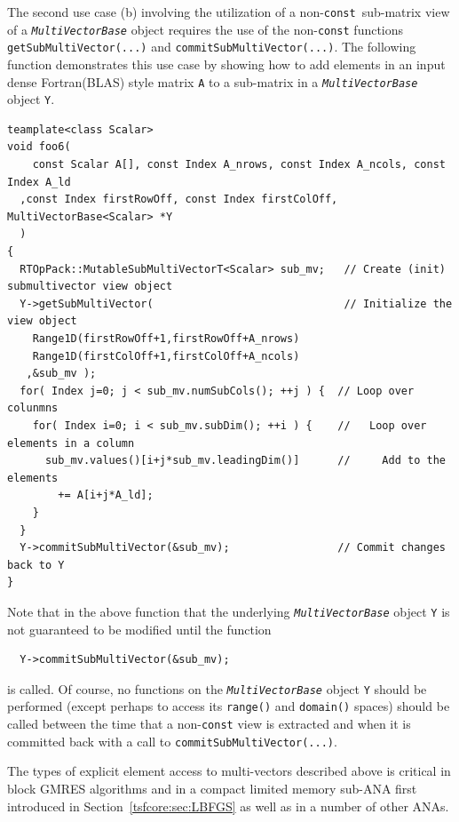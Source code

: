 \documentclass[pdf,ps2pdf,11pt]{SANDreport}
\begin{document}
The second use case (b) involving the utilization of a
non-{}\texttt{const}\ sub-matrix view of a
{}\texttt{\textit{Multi\-Vector\-Base}} object requires the use of the
non-{}\texttt{const} functions {}\texttt{get\-Sub\-Multi\-Vector(...)}
and {}\texttt{commit\-Sub\-Multi\-Vector(...)}.  The following
function demonstrates this use case by showing how to add elements in
an input dense Fortran(BLAS) style matrix {}\texttt{A} to a sub-matrix
in a {}\texttt{\textit{Multi\-Vector\-Base}} object {}\texttt{Y}.

{\scriptsize\begin{verbatim}
teamplate<class Scalar>
void foo6(
	const Scalar A[], const Index A_nrows, const Index A_ncols, const Index A_ld
  ,const Index firstRowOff, const Index firstColOff, MultiVectorBase<Scalar> *Y
  )
{
  RTOpPack::MutableSubMultiVectorT<Scalar> sub_mv;   // Create (init) submultivector view object
  Y->getSubMultiVector(                              // Initialize the view object
    Range1D(firstRowOff+1,firstRowOff+A_nrows)
    Range1D(firstColOff+1,firstColOff+A_ncols)
   ,&sub_mv );
  for( Index j=0; j < sub_mv.numSubCols(); ++j ) {  // Loop over colunmns
    for( Index i=0; i < sub_mv.subDim(); ++i ) {    //   Loop over elements in a column
      sub_mv.values()[i+j*sub_mv.leadingDim()]      //     Add to the elements
        += A[i+j*A_ld];
    }
  }
  Y->commitSubMultiVector(&sub_mv);                 // Commit changes back to Y
}
\end{verbatim}}

Note that in the above function that the underlying
{}\texttt{\textit{Multi\-Vector\-Base}} object {}\texttt{Y} is not
guaranteed to be modified until the function

{\scriptsize\begin{verbatim}
  Y->commitSubMultiVector(&sub_mv);
\end{verbatim}}

{}\noindent{}is called.  Of course, no functions on the
{}\texttt{\textit{Multi\-Vector\-Base}} object {}\texttt{Y} should be
performed (except perhaps to access its {}\texttt{range()} and
{}\texttt{domain()} spaces) should be called between the time that a
non-\texttt{const} view is extracted and when it is committed back
with a call to {}\texttt{commit\-Sub\-Multi\-Vector(...)}.

The types of explicit element access to multi-vectors described above is
critical in block GMRES algorithms and in a compact limited memory sub-ANA
first introduced in Section~\ref{tsfcore:sec:LBFGS} as well as in a number of
other ANAs.
\end{document}
